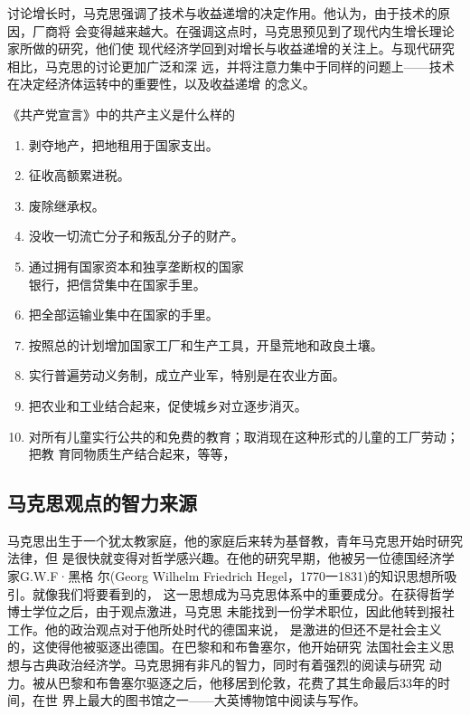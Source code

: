 讨论增长时，马克思强调了技术与收益递增的决定作用。他认为，由于技术的原因，厂商将
会变得越来越大。在强调这点时，马克思预见到了现代内生增长理论家所做的研究，他们使
现代经济学回到对增长与收益递增的关注上。与现代研究相比，马克思的讨论更加广泛和深
远，并将注意力集中于同样的问题上——技术在决定经济体运转中的重要性，以及收益递增
的念义。\clearpage
\begin{mybox}{《共产党宣言》中的共产主义是什么样的}
  \begin{multicols}{2}
    \begin{enumerate}
    \item 剥夺地产，把地租用于国家支出。
    \item 征收高额累进税。
    \item 废除继承权。
    \item 没收一切流亡分子和叛乱分子的财产。
    \item 通过拥有国家资本和独享垄断权的国家\\银行，把信贷集中在国家手里。
    \item 把全部运输业集中在国家的手里。
    \item 按照总的计划增加国家工厂和生产工具，开垦荒地和政良土壤。
    \item 实行普遍劳动义务制，成立产业军，特别是在农业方面。
    \item 把农业和工业结合起来，促使城乡对立逐步消灭。
    \item 对所有儿童实行公共的和免费的教育；取消现在这种形式的儿童的工厂劳动；把教
      育同物质生产结合起来，等等，
    \end{enumerate}
  \end{multicols}
\end{mybox}


\subsection{马克思观点的智力来源}
马克思出生于一个犹太教家庭，他的家庭后来转为基督教，青年马克思开始时研究法律，但
是很快就变得对哲学感兴趣。在他的研究早期，他被另一位德国经济学家G.W.F·黑格
尔(Georg Wilhelm Friedrich Hegel，1770一1831)的知识思想所吸引。就像我们将要看到的，
这一思想成为马克思体系中的重要成分。在获得哲学博士学位之后，由于观点激进，马克思
未能找到一份学术职位，因此他转到报社工作。他的政治观点对于他所处时代的德国来说，
是激进的但还不是社会主义的，这使得他被驱逐出德国。在巴黎和和布鲁塞尔，他开始研究
法国社会主义思想与古典政治经济学。马克思拥有非凡的智力，同时有着强烈的阅读与研究
动力。被从巴黎和布鲁塞尔驱逐之后，他移居到伦敦，花费了其生命最后33年的时间，在世
界上最大的图书馆之一——大英博物馆中阅读与写作。

